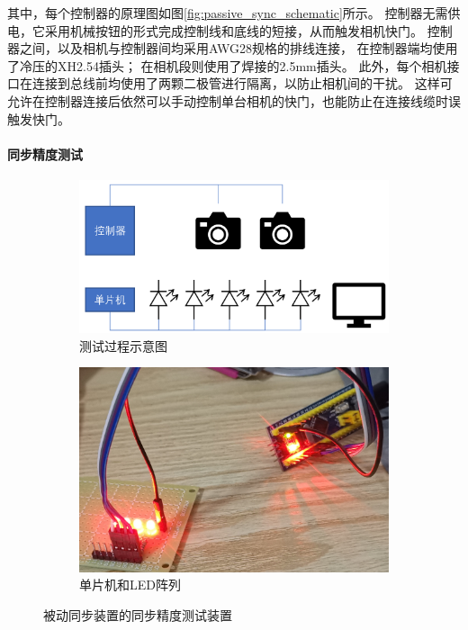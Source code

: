 其中，每个控制器的原理图如图\ref{fig:passive_sync_schematic}所示。
控制器无需供电，它采用机械按钮的形式完成控制线和底线的短接，从而触发相机快门。
控制器之间，以及相机与控制器间均采用AWG28规格的排线连接，
在控制器端均使用了冷压的XH2.54插头；
在相机段则使用了焊接的2.5mm插头。
此外，每个相机接口在连接到总线前均使用了两颗二极管进行隔离，以防止相机间的干扰。
这样可允许在控制器连接后依然可以手动控制单台相机的快门，也能防止在连接线缆时误触发快门。

\paragraph{同步精度测试}

\begin{figure}
\centering
\begin{subfigure}[b]{0.55\textwidth}
    \includegraphics[width=\textwidth]{figures/passive_sync_test}
    \caption{测试过程示意图}
\end{subfigure}%
\begin{subfigure}[b]{0.44\textwidth}
    \includegraphics[width=\textwidth]{figures/LED_array}
    \caption{单片机和LED阵列}
\end{subfigure}%
\caption{被动同步装置的同步精度测试装置}
\label{fig:passive_sync_test}
\end{figure}

